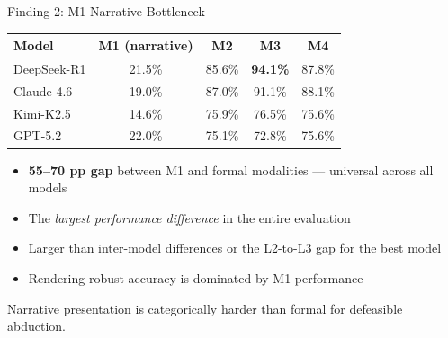 \documentclass[aspectratio=169]{beamer}
\begin{document}
\begin{frame}{Finding 2: M1 Narrative Bottleneck}

\small
\begin{tabular}{@{}lcccc@{}}
\toprule
\textbf{Model} & \textbf{M1 (narrative)} & \textbf{M2} & \textbf{M3} & \textbf{M4} \\
\midrule
DeepSeek-R1       & 21.5\% & 85.6\% & \textbf{94.1\%} & 87.8\% \\
Claude 4.6        & 19.0\% & 87.0\% & 91.1\% & 88.1\% \\
Kimi-K2.5         & 14.6\% & 75.9\% & 76.5\% & 75.6\% \\
GPT-5.2           & 22.0\% & 75.1\% & 72.8\% & 75.6\% \\
\bottomrule
\end{tabular}

\vspace{0.4em}
\begin{itemize}\setlength\itemsep{2pt}
    \item \textbf{55--70 pp gap} between M1 and formal modalities --- universal across all models
    \item The \textit{largest performance difference} in the entire evaluation
    \item Larger than inter-model differences or the L2-to-L3 gap for the best model
    \item Rendering-robust accuracy is dominated by M1 performance
\end{itemize}

\vspace{0.3em}
Narrative presentation is categorically harder than formal for defeasible abduction.
\end{frame}
\end{document}
